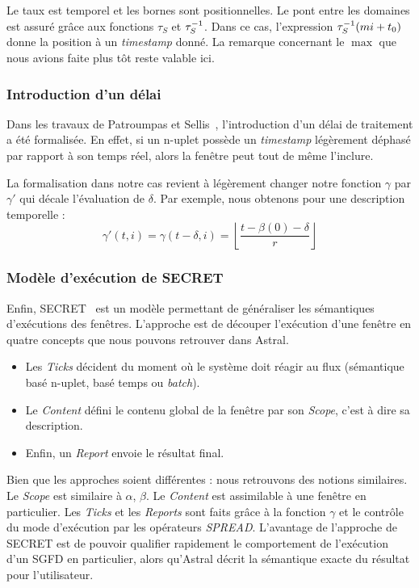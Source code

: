 Le taux est temporel et les bornes sont positionnelles. Le pont entre les domaines est assuré grâce aux fonctions $\tau_S$ et $\tau^{-1}_S$. Dans ce cas, l'expression $\tau^{-1}_S(mi+t_0)$ donne la position à un \textit{timestamp} donné. La remarque concernant le $\max$ que nous avions faite plus tôt reste valable ici.

\subsubsection{Introduction d'un délai}
Dans les travaux de Patroumpas et Sellis~\cite{Patroumpas:window}, l'introduction d'un délai de traitement a été formalisée. En effet, si un n-uplet possède un \textit{timestamp} légèrement déphasé par rapport à son temps réel, alors la fenêtre peut tout de même l'inclure.

La formalisation dans notre cas revient à légèrement changer notre fonction $\gamma$ par $\gamma'$ qui décale l'évaluation de $\delta$. Par exemple, nous obtenons pour une description temporelle : $$\gamma'(t,i) = \gamma(t-\delta,i) = \left\lfloor\frac{t-\beta(0)-\delta}{r}\right\rfloor$$

\subsubsection{Modèle d'exécution de SECRET}
Enfin, SECRET~\cite{Botan:secret} est un modèle permettant de généraliser les sémantiques d'exécutions des fenêtres. L'approche est de découper l'exécution d'une fenêtre en quatre concepts que nous pouvons retrouver dans Astral.
\begin{itemize}
	\item Les \textit{Ticks} décident du moment où le système doit réagir au flux (sémantique basé n-uplet, basé temps ou \textit{batch}).
	\item Le \textit{Content} défini le contenu global de la fenêtre par son \textit{Scope}, c'est à dire sa description.
	\item Enfin, un \textit{Report} envoie le résultat final.
\end{itemize}

Bien que les approches soient différentes : nous retrouvons des notions similaires. Le \textit{Scope} est similaire à $\alpha$, $\beta$. Le \textit{Content} est assimilable à une fenêtre en particulier. Les \textit{Ticks} et les \textit{Reports} sont faits grâce à la fonction $\gamma$ et le contrôle du mode d'exécution par les opérateurs \textit{SPREAD}. L'avantage de l'approche de SECRET est de pouvoir qualifier rapidement le comportement de l'exécution d'un SGFD en particulier, alors qu'Astral décrit la sémantique exacte du résultat pour l'utilisateur.

